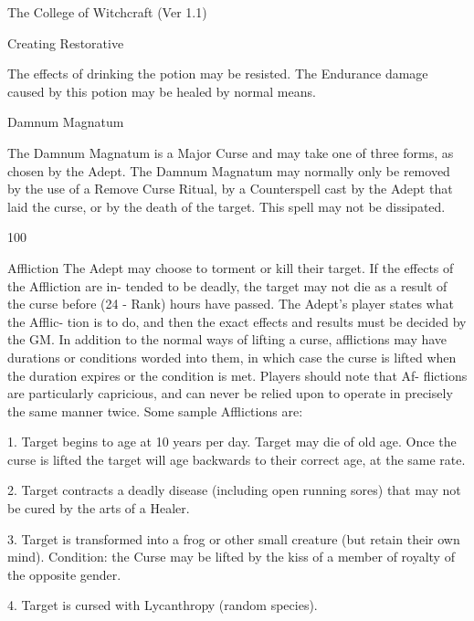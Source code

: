\begin{Chapter}{The College of Witchcraft (Ver 1.1)}
\begin{spell}[S-9]{Creating Restorative }
\begin{effects}
The effects of drinking the potion may be resisted. 
The Endurance damage caused by this potion may 
be healed by normal means. 

\end{effects}
\end{spell}

\begin{spell}[S-10]{Damnum Magnatum }

\begin{effects}
The Damnum Magnatum is a Major Curse 
and may take one of three forms, as chosen by the 
Adept.  The  Damnum  Magnatum  may  normally 
only  be  removed  by  the  use  of  a  Remove  Curse 
Ritual,  by  a  Counterspell  cast  by  the  Adept  that 
laid  the  curse,  or  by  the  death  of  the  target.  This 
spell may not be dissipated. 

100 

Affliction The Adept may choose to torment or kill 
their  target.  If  the  effects  of  the  Affliction  are  in-
tended  to  be  deadly,  the  target  may  not  die  as  a 
result  of  the  curse  before  (24  -  Rank)  hours  have 
passed.  The  Adept’s  player  states  what  the  Afflic-
tion is to do, and then the exact effects and results 
must  be  decided  by  the  GM.  In  addition  to  the 
normal ways of lifting a curse, afflictions may have 
durations or conditions worded into them, in which 
case the curse is lifted when the duration expires or 
the  condition  is  met.  Players  should  note  that  Af-
flictions  are  particularly  capricious,  and  can  never 
be  relied  upon  to  operate  in  precisely  the  same 
manner twice. Some sample Afflictions are: 

1. Target begins to age at 10 years per day. Target 
may  die  of  old  age.  Once  the  curse  is  lifted  the 
target  will  age  backwards  to  their  correct  age,  at 
the same rate. 

2.  Target  contracts  a  deadly  disease  (including 
open  running  sores)  that  may  not  be  cured  by  the 
arts of a Healer. 

3.  Target  is  transformed  into a  frog  or  other  small 
creature (but retain their own mind). Condition: the 
Curse  may  be  lifted  by  the  kiss  of  a  member  of 
royalty of the opposite gender. 

4.  Target  is  cursed  with  Lycanthropy  (random 
species). 


\end{effects}
\end{spell}
\end{Chapter}
